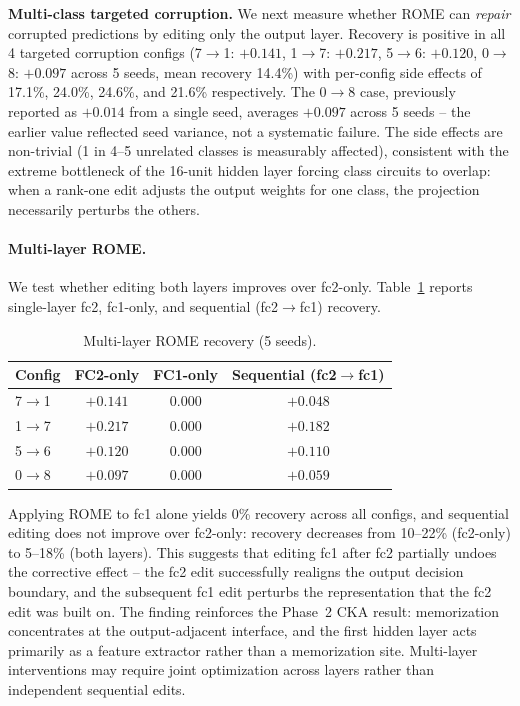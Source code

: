\documentclass{article}
\begin{document}
\textbf{Multi-class targeted corruption.} We next measure whether ROME can \emph{repair} corrupted predictions by editing only the output layer. Recovery is positive in all 4 targeted corruption configs (7$\to$1: $+0.141$, 1$\to$7: $+0.217$, 5$\to$6: $+0.120$, 0$\to$8: $+0.097$ across 5 seeds, mean recovery 14.4\%) with per-config side effects of 17.1\%, 24.0\%, 24.6\%, and 21.6\% respectively. The 0$\to$8 case, previously reported as $+0.014$ from a single seed, averages $+0.097$ across 5 seeds -- the earlier value reflected seed variance, not a systematic failure. The side effects are non-trivial (1 in 4--5 unrelated classes is measurably affected), consistent with the extreme bottleneck of the 16-unit hidden layer forcing class circuits to overlap: when a rank-one edit adjusts the output weights for one class, the projection necessarily perturbs the others.

\paragraph{Multi-layer ROME.} We test whether editing both layers improves over fc2-only. Table~\ref{tab:multilayer_rome} reports single-layer fc2, fc1-only, and sequential (fc2$\to$fc1) recovery.

\begin{table}[t]
  \centering
  \caption{Multi-layer ROME recovery (5 seeds).}
  \label{tab:multilayer_rome}
  \begin{tabular}{lccc}
    \toprule
    Config & FC2-only & FC1-only & Sequential (fc2$\to$fc1) \\
    \midrule
    7$\to$1 & $+0.141$ & $0.000$ & $+0.048$ \\
    1$\to$7 & $+0.217$ & $0.000$ & $+0.182$ \\
    5$\to$6 & $+0.120$ & $0.000$ & $+0.110$ \\
    0$\to$8 & $+0.097$ & $0.000$ & $+0.059$ \\
    \bottomrule
  \end{tabular}
\end{table}

Applying ROME to fc1 alone yields 0\% recovery across all configs, and sequential editing does not improve over fc2-only: recovery decreases from 10--22\% (fc2-only) to 5--18\% (both layers). This suggests that editing fc1 after fc2 partially undoes the corrective effect -- the fc2 edit successfully realigns the output decision boundary, and the subsequent fc1 edit perturbs the representation that the fc2 edit was built on. The finding reinforces the Phase~2 CKA result: memorization concentrates at the output-adjacent interface, and the first hidden layer acts primarily as a feature extractor rather than a memorization site. Multi-layer interventions may require joint optimization across layers rather than independent sequential edits.
\end{document}
